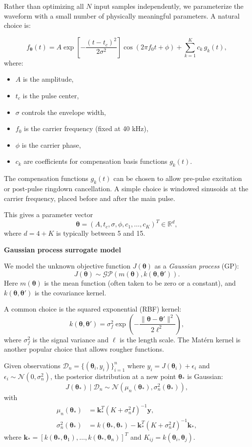 \documentclass[11pt]{article}
\begin{document}
Rather than optimizing all $N$ input samples independently, we parameterize the waveform with a small number of physically meaningful parameters.
A natural choice is:

\[
f_{\bm{\theta}}(t) = A \exp\left[-\frac{(t - t_c)^2}{2\sigma^2}\right] \cos(2\pi f_0 t + \phi) + \sum_{k=1}^{K} c_k \, g_k(t),
\]
where:
\begin{itemize}[nosep]
    \item $A$ is the amplitude,
    \item $t_c$ is the pulse center,
    \item $\sigma$ controls the envelope width,
    \item $f_0$ is the carrier frequency (fixed at 40 kHz),
    \item $\phi$ is the carrier phase,
    \item $c_k$ are coefficients for compensation basis functions $g_k(t)$.
\end{itemize}

The compensation functions $g_k(t)$ can be chosen to allow pre-pulse excitation or post-pulse ringdown cancellation.
A simple choice is windowed sinusoids at the carrier frequency, placed before and after the main pulse.

This gives a parameter vector
\[
\bm{\theta} = (A, t_c, \sigma, \phi, c_1, \ldots, c_K)^T \in \mathbb{R}^{d},
\]
where $d = 4 + K$ is typically between 5 and 15.

\vspace{1em}
\begin{center}
\textbf{Gaussian process surrogate model}
\end{center}

We model the unknown objective function $J(\bm{\theta})$ as a \emph{Gaussian process} (GP):
\[
J(\bm{\theta}) \sim \mathcal{GP}(m(\bm{\theta}), k(\bm{\theta}, \bm{\theta}')).
\]
Here $m(\bm{\theta})$ is the mean function (often taken to be zero or a constant), and $k(\bm{\theta}, \bm{\theta}')$ is the covariance kernel.

A common choice is the squared exponential (RBF) kernel:
\[
k(\bm{\theta}, \bm{\theta}') = \sigma_f^2 \exp\left(-\frac{\|\bm{\theta} - \bm{\theta}'\|^2}{2\ell^2}\right),
\]
where $\sigma_f^2$ is the signal variance and $\ell$ is the length scale.
The Mat\'{e}rn kernel is another popular choice that allows rougher functions.

Given observations $\mathcal{D}_n = \{(\bm{\theta}_i, y_i)\}_{i=1}^{n}$ where $y_i = J(\bm{\theta}_i) + \epsilon_i$ and $\epsilon_i \sim \mathcal{N}(0, \sigma_n^2)$, the posterior distribution at a new point $\bm{\theta}_*$ is Gaussian:
\[
J(\bm{\theta}_*) \mid \mathcal{D}_n \sim \mathcal{N}(\mu_n(\bm{\theta}_*), \sigma_n^2(\bm{\theta}_*)),
\]
with
\begin{align}
\mu_n(\bm{\theta}_*) &= \mathbf{k}_*^T (K + \sigma_n^2 I)^{-1} \mathbf{y}, \\
\sigma_n^2(\bm{\theta}_*) &= k(\bm{\theta}_*, \bm{\theta}_*) - \mathbf{k}_*^T (K + \sigma_n^2 I)^{-1} \mathbf{k}_*,
\end{align}
where $\mathbf{k}_* = [k(\bm{\theta}_*, \bm{\theta}_1), \ldots, k(\bm{\theta}_*, \bm{\theta}_n)]^T$ and $K_{ij} = k(\bm{\theta}_i, \bm{\theta}_j)$.
\end{document}
